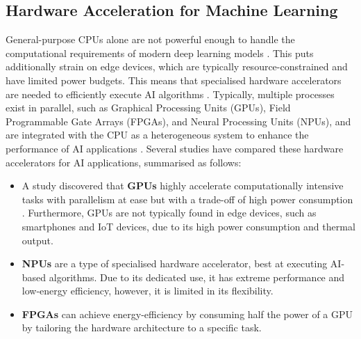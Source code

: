 \documentclass[12pt, a4paper, ukenglish]{article}
\begin{document}
    \subsection{Hardware Acceleration for Machine Learning} \label{sec: hardware accel}
    General-purpose CPUs alone are not powerful enough to handle the computational requirements of modern deep learning models \cite{zhang_energy-efficient_2022}. This puts additionally strain on edge devices, which are typically resource-constrained and have limited power budgets. This means that specialised hardware accelerators are needed to efficiently execute AI algorithms \cite{manor_custom_2022}. Typically, multiple processes exist in parallel, such as Graphical Processing Units (GPUs), Field Programmable Gate Arrays (FPGAs), and Neural Processing Units (NPUs), and are integrated with the CPU as a heterogeneous system  to enhance the performance of AI applications \cite{manor_custom_2022}. Several studies have compared these hardware accelerators for AI applications, summarised as follows:
    \begin{itemize}
        \item A study discovered that \textbf{GPUs} highly accelerate computationally intensive tasks with parallelism at ease but with a trade-off of high power consumption \cite{oh_investigation_2017}. Furthermore, GPUs are not typically found in edge devices, such as smartphones and IoT devices, due to its high power consumption and thermal output. 
        \item \textbf{NPUs} are a type of specialised hardware accelerator, best at executing AI-based algorithms. Due to its dedicated use, it has extreme performance and low-energy efficiency, however, it is limited in its flexibility.
        \item \textbf{FPGAs} can achieve energy-efficiency by consuming half the power of a GPU \cite{liu_energy-efficient_2024} by tailoring the hardware architecture to a specific task. 
    \end{itemize}
    
\end{document}
